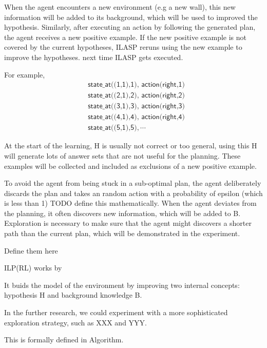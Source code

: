 When the agent encounters a new environment (e.g a new wall), this new information will be added to its background, which will be used to improved the hypothesis. 
Similarly, after executing an action by following the generated plan, the agent receives a new positive example. If the new positive example is not covered by the current hypotheses, 
ILASP reruns using the new example to improve the hypotheses. 
next time ILASP gets executed.

For example,
\begin{equation*}
\begin{split}
&\textsf{state\_at((1,1),1), action(right,1)}\\
&\textsf{state\_at((2,1),2), action(right,2)}\\
&\textsf{state\_at((3,1),3), action(right,3)}\\
&\textsf{state\_at((4,1),4), action(right,4)}\\
&\textsf{state\_at((5,1),5)}, \cdots
\end{split}
\end{equation*}

At the start of the learning, H is usually not correct or too general, using this H will generate lots of answer sets that are not useful for the planning.
These examples will be collected and included as exclusions of a new positive example.

To avoid the agent from being stuck in a sub-optimal plan, the agent deliberately discards the plan and takes an random action with a probability of
epsilon (which is less than 1) TODO define this mathematically.
When the agent deviates from the planning, it often discovers new information, which will be added to B.
Exploration is necessary to make sure that the agent might discovers a shorter path than the current plan, which will be demonstrated in the experiment.

Define them here

ILP(RL) works by

It buids the model of the environment by improving two internal concepts: hypothesis H and background knowledge B.

In the further research, we could experiment with a more sophisticated exploration strategy, such as XXX and YYY.

This is formally defined in Algorithm.

